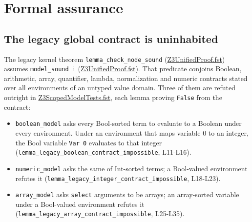 \documentclass[10pt,a4paper]{article}
\begin{document}
\section{Formal assurance}\label{sec:5-formal-assurance}

\subsection{The legacy global contract is uninhabited}\label{sec:51-the-legacy-global-contract-is-uninhabited}

The legacy kernel theorem \texttt{lemma\_\allowbreak{}check\_\allowbreak{}node\_\allowbreak{}sound} (\href{https://github.com/Z3Prover/z3/blob/8fbb275aba0472e862e289c7af1331b3bd5d512c/fstar/Z3UnifiedProof.fst\#L1884-L1961}{Z3Unified\allowbreak{}Proof.\allowbreak{}fst}) assumes \texttt{model\_\allowbreak{}sound i} (\href{https://github.com/Z3Prover/z3/blob/8fbb275aba0472e862e289c7af1331b3bd5d512c/fstar/Z3UnifiedProof.fst\#L1164-L1175}{Z3Unified\allowbreak{}Proof.\allowbreak{}fst}). That predicate conjoins Boolean, arithmetic, array, quantifier, lambda, normalization and numeric contracts stated over all environments of an untyped value domain. Three of them are refuted outright in \href{https://github.com/Z3Prover/z3/blob/8fbb275aba0472e862e289c7af1331b3bd5d512c/fstar/Z3ScopedModelTests.fst}{Z3Scoped\allowbreak{}Model\allowbreak{}Tests.\allowbreak{}fst}, each lemma proving \texttt{False} from the contract:

\begin{itemize}\setlength{\itemsep}{1pt}\setlength{\parskip}{0pt}

\item \texttt{boolean\_\allowbreak{}model} asks every Bool-sorted term to evaluate to a Boolean under every environment. Under an environment that maps variable 0 to an integer, the Bool variable \texttt{Var 0} evaluates to that integer (\texttt{lemma\_\allowbreak{}legacy\_\allowbreak{}boolean\_\allowbreak{}contract\_\allowbreak{}impossible}, L11-L16).

\item \texttt{numeric\_\allowbreak{}model} asks the same of Int-sorted terms; a Bool-valued environment refutes it (\texttt{lemma\_\allowbreak{}legacy\_\allowbreak{}integer\_\allowbreak{}contract\_\allowbreak{}impossible}, L18-L23).

\item \texttt{array\_\allowbreak{}model} asks \texttt{select} arguments to be arrays; an array-sorted variable under a Bool-valued environment refutes it (\texttt{lemma\_\allowbreak{}legacy\_\allowbreak{}array\_\allowbreak{}contract\_\allowbreak{}impossible}, L25-L35).

\end{itemize}
\end{document}
